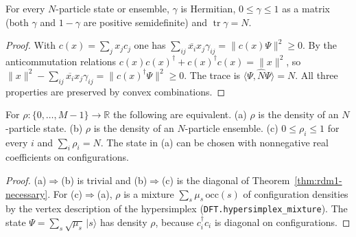 \begin{theorem}\label{thm:rdm1-necessary}
  \leanok
  For every $N$-particle state or ensemble, $\gamma$ is Hermitian, $0\le\gamma\le1$ as a matrix (both $\gamma$ and $1-\gamma$ are
  positive semidefinite) and $\operatorname{tr}\gamma=N$.
\end{theorem}
\begin{proof}\leanok
  With $c(x)=\sum_jx_jc_j$ one has $\sum_{ij}\overline{x_i}x_j\gamma_{ij}=\|c(x)\Psi\|^2\ge0$. By the anticommutation relations
  $c(x)c(x)^\dagger+c(x)^\dagger c(x)=\|x\|^2$, so $\|x\|^2-\sum_{ij}\overline{x_i}x_j\gamma_{ij}=\|c(x)^\dagger\Psi\|^2\ge0$. The trace
  is $\langle\Psi,\hat N\Psi\rangle=N$. All three properties are preserved by convex combinations.
\end{proof}

\begin{corollary}\label{cor:density-rep}
  \leanok
  For $\rho\colon\{0,\dots,M-1\}\to\mathbb R$ the following are equivalent.
  (a) $\rho$ is the density of an $N$-particle state.
  (b) $\rho$ is the density of an $N$-particle ensemble.
  (c) $0\le\rho_i\le1$ for every $i$ and $\sum_i\rho_i=N$.
  The state in (a) can be chosen with nonnegative real coefficients on configurations.
\end{corollary}
\begin{proof}\leanok
  (a)$\Rightarrow$(b) is trivial and (b)$\Rightarrow$(c) is the diagonal of Theorem~\ref{thm:rdm1-necessary}. For
  (c)$\Rightarrow$(a), $\rho$ is a mixture $\sum_s\mu_s\,\mathrm{occ}(s)$ of configuration densities by the vertex description
  of the hypersimplex (\texttt{DFT.hypersimplex\_mixture}). The state $\Psi=\sum_s\sqrt{\mu_s}\,|s\rangle$ has density $\rho$,
  because $c_i^\dagger c_i$ is diagonal on configurations.
\end{proof}

